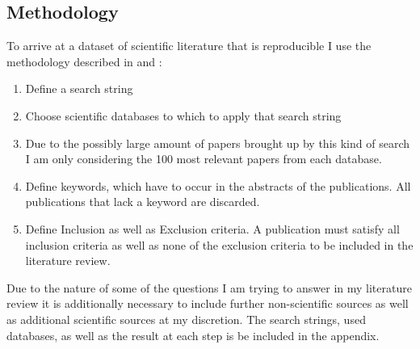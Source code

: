 \documentclass[
	11pt,								%
	DIV10,								%
	a4paper,         					%
	oneside,							%
	headheight=20pt,					%
	footheight=20pt,					%
    parskip=full,						%
    listof=totoc,						%
	bibliography=totoc,					%
	index=totoc,						%
]{scrartcl}
\begin{document}
\subsection{Methodology}
To arrive at a dataset of scientific literature that is reproducible I use the methodology described in \cite{petersenSystematicMappingStudies} and \cite{pop00975}:

\begin{enumerate}
	\item Define a search string
	\item Choose scientific databases to which to apply that search string
	\item Due to the possibly large amount of papers brought up by this kind of search I am only considering the 100 most relevant papers from each database.
	\item Define keywords, which have to occur in the abstracts of the publications. All publications that lack a keyword are discarded.
	\item Define Inclusion as well as Exclusion criteria. A publication must satisfy all inclusion criteria as well as none of the exclusion criteria to be included in the literature review.
\end{enumerate}
Due to the nature of some of the questions I am trying to answer in my literature review it is additionally necessary to include further non-scientific sources as well as additional scientific sources at my discretion.
The search strings, used databases, as well as the result at each step is be included in the appendix.
\end{document}
